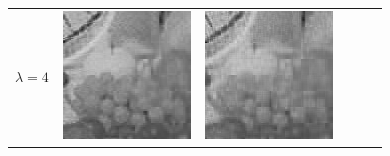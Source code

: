 \documentclass[11pt,a4paper,openright,oneside]{book}
\numberwithin{equation}{section}
\begin{document}
{\begin{figure}[h]
\begin{adjustwidth}{-3cm}{-3cm}
\begin{tabular}{>{\centering\arraybackslash}m{1.5cm} m{2.5cm} m{2.5cm} m{2.5cm} m{2.5cm} m{2.5cm}}
        $\lambda = 4$ &
        \includegraphics[width=\linewidth]{media/tnale/AAAfruits-comp1-ale-4.png} &
        \includegraphics[width=\linewidth]{media/tnale/AAAfruits-comp2-ale-4.png} &

\end{tabular}
\end{adjustwidth}
\end{figure}}
\end{document}
